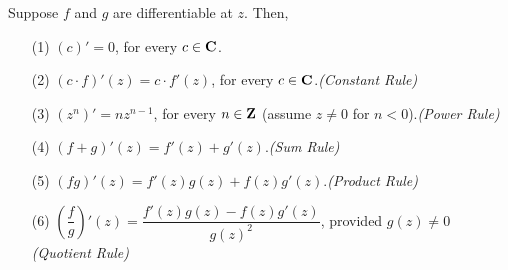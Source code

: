 \begin{theorem}
Suppose $f$ and $g$ are differentiable at $z$. Then,
\begin{itemize}[itemsep=1em]
\item[(1)] $(c)' = 0$, for every $c \in \mathbf C$.
\item[(2)] $(c\cdot f)'(z) = c\cdot f'(z)$, for every $c \in \mathbf C$.\hfill \emph{(Constant Rule)}
\item[(3)] $(z^n)' = nz^{n-1}$, for every $n \in \mathbf Z$ (assume $z \neq 0$ for $n<0$).\hfill \emph{(Power Rule)}
\item[(4)] $(f + g)'(z) = f'(z) + g'(z)$.\hfill \emph{(Sum Rule)}
\item[(5)] $(fg)'(z) = f'(z)g(z) + f(z)g'(z)$.\hfill \emph{(Product Rule)}
\item[(6)] $\left(\dfrac{f}{g}\right)'(z) = \dfrac{f'(z)g(z) - f(z)g'(z)}{g(z)^2}$, provided $g(z) \neq 0$ \hfill \emph{(Quotient Rule)}
\end{itemize}
\end{theorem}
